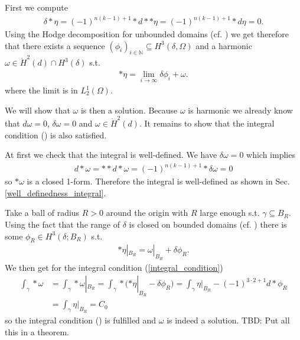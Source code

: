 \documentclass[12pt,a4paper]{article}
\theoremstyle{definition}
\newcommand{\omegabar}{\overline{\Omega}}
\begin{document}
First we compute
\begin{align*}
    \delta *\eta = (-1)^{n(k-1)+1} *d**\eta = (-1)^{n(k-1)+1} *d\eta = 0.
\end{align*}
Using the Hodge decomposition for unbounded domains 
(cf. \cite[Lemma 1]{picard}) we get therefore that there exists 
a sequence  $(\phi_i)_{i\in \mathbb{N}} \subseteq H^3(\delta,\Omega)$ 
and a harmonic $\omega \in \mathring{H}^2(d) \cap H^3(\delta)$ s.t. 
\begin{align*}
    *\eta = \lim\limits_{i \rightarrow \infty} \delta \phi_i + \omega.
\end{align*}
where the limit is in $L^1_2(\Omega)$. 


We will show that $\omega$ is then a solution. Because $\omega$ is harmonic
we already know that $d\omega = 0$, $\delta \omega = 0$ and 
$\omega \in \mathring{H}^2(d)$. It remains to show that the integral condition
() is also satisfied.

At first we check that the integral is well-defined. We have $\delta \omega = 0$
which implies
\begin{align*}
    d * \omega = ** d*\omega = (-1)^{n(k-1)+1} *\delta \omega = 0
\end{align*}
so $*\omega$ is a closed 1-form. Therefore the integral is well-defined as shown
in Sec.\,\ref{well_definedness_integral}.

Take a ball of radius $R>0$ 
around the origin with $R$ large enough s.t. $\gamma \subseteq B_R$. 
Using the fact that the range of $\delta$ is closed on bounded domains 
(cf. \cite[Lemma 7]{picard}) there is some $\phi_R \in H^3(\delta;B_R)$ s.t.
\begin{align*}
    *\eta|_{B_R} = \omega|_{B_R} + \delta \phi_R.
\end{align*}
We then get for the integral condition (\ref{integral_condition}) 
\begin{align*}
    \int_\gamma *\omega &= \int_\gamma *\omega|_{B_R} = 
    \int_\gamma *(*\eta|_{B_R} - \delta \phi_R) = 
    \int_\gamma \eta|_{B_R} - (-1)^{3\cdot 2+1} d * \phi_R \\
    &= \int_\gamma \eta|_{B_R} = C_0
\end{align*}
so the integral condition () is fulfilled and 
$\omega$ is indeed a solution. \newline
{\color{red} TBD: Put all this in a theorem.}

\end{document}
